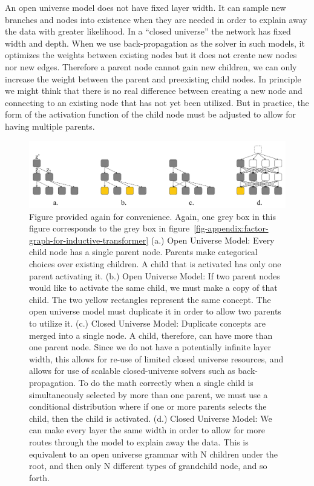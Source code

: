 \documentclass{article}
\begin{document}
An open universe model does not have fixed layer width. It can sample new branches and nodes into existence when they are needed in order to explain away the data with greater likelihood.  In a ``closed universe'' the network has fixed width and depth.  When we use back-propagation as the solver in such models, it optimizes the weights between existing nodes but it does not create new nodes nor new edges.  Therefore a parent node cannot gain new children, we can only increase the weight between the parent and preexisting child nodes.  In principle we might think that there is no real difference between creating a new node and connecting to an existing node that has not yet been utilized.  But in practice, the form of the activation function of the child node must be adjusted to allow for having multiple parents.

\begin{figure}[H]
    \centering
    \includegraphics[width=\textwidth]{figures/from-open-universe-to-closed-universe.pdf}
    \caption{Figure provided again for convenience. Again, one grey box in this figure corresponds to the grey box in figure~\ref{fig-appendix:factor-graph-for-inductive-transformer} (a.) Open Universe Model: Every child node has a single parent node.  Parents make categorical choices over existing children.  A child that is activated has only one parent activating it. (b.) Open Universe Model: If two parent nodes would like to activate the same child, we must make a copy of that child.  The two yellow rectangles represent the same concept.  The open universe model must duplicate it in order to allow two parents to utilize it.  (c.) Closed Universe Model: Duplicate concepts are merged into a single node.  A child, therefore, can have more than one parent node.  Since we do not have a potentially infinite layer width, this allows for re-use of limited closed universe resources, and allows for use of scalable closed-universe solvers such as back-propagation.  To do the math correctly when a single child is simultaneously selected by more than one parent, we must use a conditional distribution where if one or more parents selects the child, then the child is activated. (d.) Closed Universe Model: We can make every layer the same width in order to allow for more routes through the model to explain away the data.  This is equivalent to an open universe grammar with N children under the root, and then only N different types of grandchild node, and so forth.}
    \label{fig:from-open-universe-to-closed-universe-appendix}
\end{figure}
\end{document}
